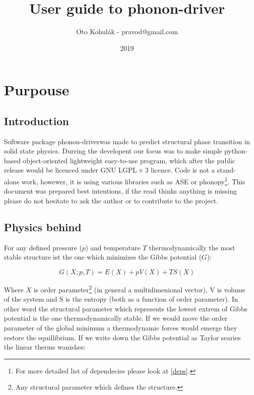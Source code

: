 \documentclass[12pt]{article}
\begin{document}
\newcommand{\pe}{phonon-driver}

\title{User guide to \pe}
\date{2019}
\author{Oto Kohul\'{a}k - pravod@gmail.com}

\maketitle

\tableofcontents

\section{Purpouse}

\subsection{Introduction}
Software package \pe was made to predict structural phase transition in solid state physics. Durring the developent our focus was to make simple python-based object-oriented lightweight easy-to-use program, which after the public release would be licenced under GNU LGPL v 3 licence\cite{GPL}. Code is not a stand-alone work, howewer, it is using various libraries such as ASE\cite{ase-paper} or phonopy\cite{phonopy}\footnote{For more detailed list of dependecies please look at \ref{deps}.}. This document was prepared best intentions, if the read thinks anything is missing please do not hesitate to ask the author or to contribute to the project.

\subsection{Physics behind}

For any defined pressure ($p$) and temperature $T$ thermodynamically the most stable structure ist the one which minimizes the Gibbs potential ($G$):

\begin{equation}
G(X; p, T) = E(X) + pV(X) + TS(X)
\end{equation}

Where $X$ is order parameter\footnote{Any structural parameter which defines the structure.} (in general a multidimenional vector), V is volume of the system and S is the entropy (both as a function of order parameter). In other word the structural parameter which represents the lowest extrem of Gibbs potential is the one thermodynamically stable. If we would move the order parameter of the global minimum a thermodynamic forces would emerge they restore the equillibrium. If we write down the Gibbs potential as Taylor searies the linear therms wanishes:
\end{document}
